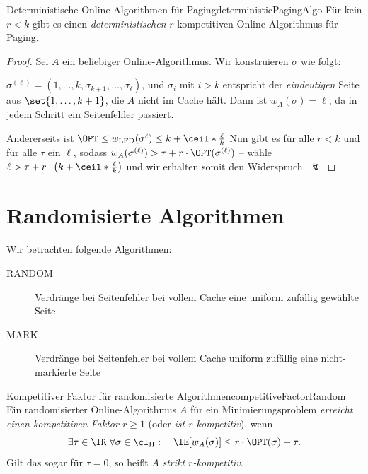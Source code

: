 \documentclass[language=ngerman,algolist]{TemplateLecture}
\begin{document}
\begin{thm}{Deterministische Online-Algorithmen für Paging}{deterministicPagingAlgo}
    Für kein $r < k$ gibt es einen \emph{deterministischen} $r$-kompetitiven Online-Algorithmus für Paging.
\end{thm}

\begin{proof}
    Sei $A$ ein beliebiger Online-Algorithmus. Wir konstruieren $\sigma$ wie folgt:
    
    $\sigma^{(\ell)} = (1,\ldots,k,\sigma_{k+1}, \ldots, \sigma_\ell)$, und $\sigma_i$ mit $i > k$ entspricht der \emph{eindeutigen} Seite aus $\set{1,\ldots,k+1}$, die $A$ nicht im Cache hält. Dann ist $w_A(\sigma) = \ell$, da in jedem Schritt ein Seitenfehler passiert.
    

    Andererseits ist $\OPT \leq w_{\text{LFD}}(\sigma^{\ell}) \leq k + \ceil*{\frac{\ell}{k}}$
    Nun gibt es für alle $r < k$ und für alle $\tau$ ein $\ell$, sodass $w_A(\sigma^{(\ell)}) > \tau + r \cdot \OPT(\sigma^{(\ell)})$ -- wähle $\ell > \tau + r \cdot \left( k + \ceil*{\frac{\ell}{k}} \right)$ und wir erhalten somit den Widerspruch. $\lightning$
\end{proof}

\section{Randomisierte Algorithmen}
Wir betrachten folgende Algorithmen:
\begin{description}
    \item[RANDOM] Verdränge bei Seitenfehler bei vollem Cache eine uniform zufällig gewählte Seite
    \item[MARK] Verdränge bei Seitenfehler bei vollem Cache uniform zufällig eine nicht-markierte Seite
\end{description}

\begin{defi}{Kompetitiver Faktor für randomisierte Algorithmen}{competitiveFactorRandom}
    Ein randomisierter Online-Algorithmus $A$ für ein Minimierungsproblem \emph{erreicht einen kompetitiven Faktor $r \geq 1$} (oder \emph{ist $r$-kompetitiv}), wenn
    \begin{equation*}
        \exists \tau \in \IR ~ \forall \sigma \in \cI_\Pi:\quad \IE[w_A(\sigma)] \leq r \cdot \OPT(\sigma) + \tau.
    \end{equation*}
    Gilt das sogar für $\tau = 0$, so heißt $A$ \emph{strikt $r$-kompetitiv}.
\end{defi}
\end{document}
